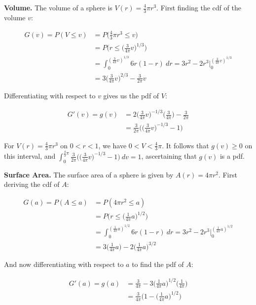 \documentclass[10pt, oneside]{article}
\begin{document}
\begin{enumerate}[label=5.\arabic*]
\textbf{Volume.} The volume of a sphere is $V(r) = \frac{4}{3} \pi r^3$. First finding the cdf of the volume $v$:

\begin{align*}
G(v) = P(V \leq v) &= P \Big( \frac{4}{3} \pi r^3 \leq v \Big) \\
&= P \Big( r \leq \Big( \frac{3}{4 \pi} v \Big)^{1/3} \Big) \\
&= \int^{(\frac{3}{4 \pi} v)^{1/3}}_0 6r(1 - r) \ dr = 3r^2 - 2r^3 \Big|^{(\frac{3}{4 \pi} v)^{1/3}}_0 \\
&= 3 \Big( \frac{3}{4 \pi} v \Big)^{2/3} - \frac{3}{2 \pi} v 
\end{align*}

Differentiating with respect to $v$ gives us the pdf of $V$:

\begin{align*}
G'(v) = g(v) &= 2 \Big( \frac{3}{4 \pi} v \Big)^{-1/3} \Big( \frac{3}{4 \pi} \Big) - \frac{3}{2 \pi} \\
&= \boxed{\frac{3}{2 \pi} \Big( \Big( \frac{3}{4 \pi} v \Big)^{-1/3} - 1 \Big)}
\end{align*}

For $V(r) = \frac{4}{3} \pi r^3$ on $0 < r < 1$, we have $0 < V < \frac{4}{3} \pi$. It follows that $g(v) \geq 0$ on this interval, and $\int^{\frac{4}{3} \pi}_0 \frac{3}{2 \pi} \Big( \Big( \frac{3}{4 \pi} v \Big)^{-1/3} - 1 \Big) \ dv = \boxed{1}$, ascertaining that $g(v)$ is a pdf.

\textbf{Surface Area.} The surface area of a sphere is given by $A(r) = 4 \pi r^2$. First deriving the cdf of $A$:

\begin{align*}
G(a) = P(A \leq a) &= P(4 \pi r^2 \leq a) \\
&= P\Big( r \leq \Big( \frac{1}{4 \pi} a \Big)^{1/2} \Big) \\
&= \int^{(\frac{1}{4 \pi} a)^{1/2}}_0 6r(1 - r) \ dr = 3r^2 - 2r^3 \Big|^{(\frac{1}{4\pi} a)^{1/2}}_0 \\
&= 3 \Big( \frac{1}{4 \pi} a \Big) - 2 \Big( \frac{1}{4 \pi} a \Big)^{3/2}
\end{align*}

And now differentiating with respect to $a$ to find the pdf of $A$:

\begin{align*}
G'(a) = g(a) &= \frac{3}{4 \pi} - 3 \Big( \frac{1}{4 \pi} a \Big)^{1/2} \Big( \frac{1}{4 \pi} \Big) \\
&= \boxed{ \frac{3}{4 \pi} \Big( 1 - \Big( \frac{1}{4 \pi} a \Big)^{1/2} \Big) }
\end{align*}


\end{enumerate}
\end{document}

